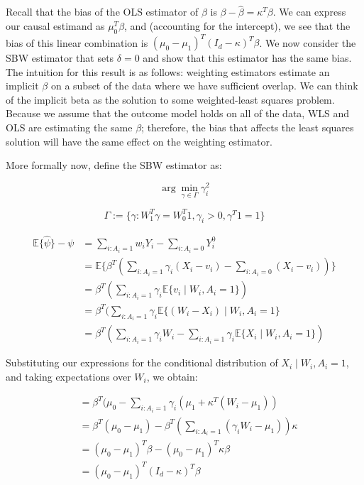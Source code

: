 \documentclass[12pt]{article}
\begin{document}
Recall that the bias of the OLS estimator of $\beta$ is $\beta - \hat{\beta} = \kappa^T\beta$. We can express our causal estimand as $\mu_0^T\beta$, and (accounting for the intercept), we see that the bias of this linear combination is $(\mu_0 - \mu_1)^T(I_d - \kappa)^T\beta$. We now consider the SBW estimator that sets $\delta = 0$ and show that this estimator has the same bias. The intuition for this result is as follows: weighting estimators estimate an implicit $\beta$ on a subset of the data where we have sufficient overlap. We can think of the implicit beta as the solution to some weighted-least squares problem. Because we assume that the outcome model holds on all of the data, WLS and OLS are estimating the same $\beta$; therefore, the bias that affects the least squares solution will have the same effect on the weighting estimator.  

More formally now, define the SBW estimator as:

$$
\arg\min_{\gamma \in \Gamma} \gamma_i^2
$$

$$
\Gamma := \{\gamma: W_1^T\gamma = W_0^T1, \gamma_i > 0, \gamma^T1 = 1\}
$$

\begin{align*}
    \mathbb{E}\{\hat{\psi}\} - \psi &= \sum_{i: A_i = 1}w_iY_i - \sum_{i: A_i = 0}Y_i^0 \\
    &= \mathbb{E}\{\beta^T(\sum_{i: A_i = 1} \gamma_i (X_i - v_i) - \sum_{i: A_i = 0} (X_i - v_i))\} \\
    &= \beta^T(\sum_{i: A_i = 1} \gamma_i\mathbb{E}\{v_i \mid W_i, A_i = 1\}) \\
    &= \beta^T(\sum_{i: A_i = 1} \gamma_i\mathbb{E}\{(W_i - X_i) \mid W_i, A_i = 1\} \\
    &= \beta^T(\sum_{i: A_i = 1} \gamma_iW_i - \sum_{i: A_i = 1} \gamma_i\mathbb{E}\{X_i \mid W_i, A_i = 1\})
\end{align*}

Substituting our expressions for the conditional distribution of $X_i \mid W_i, A_i = 1$, and taking expectations over $W_i$, we obtain:

\begin{align*}
    &= \beta^T(\mu_0 - \sum_{i: A_i = 1} \gamma_i(\mu_1 + \kappa^T(W_i - \mu_1)) \\
    &= \beta^T(\mu_0 - \mu_1) - \beta^T(\sum_{i: A_i = 1}(\gamma_iW_i - \mu_1))\kappa \\
    &= (\mu_0 - \mu_1)^T\beta - (\mu_0 - \mu_1)^T\kappa\beta \\
    &= (\mu_0 - \mu_1)^T(I_d - \kappa)^T\beta
\end{align*}
\end{document}

